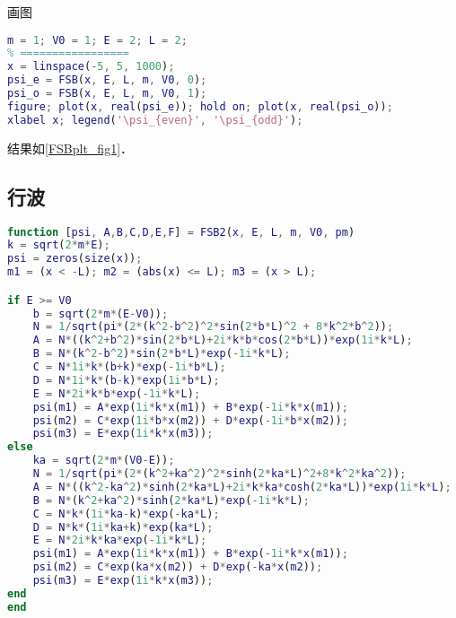 画图
\begin{lstlisting}[language=matlab]
% === 设置参数 =====
m = 1; V0 = 1; E = 2; L = 2;
% =================
x = linspace(-5, 5, 1000);
psi_e = FSB(x, E, L, m, V0, 0);
psi_o = FSB(x, E, L, m, V0, 1);
figure; plot(x, real(psi_e)); hold on; plot(x, real(psi_o));
xlabel x; legend('\psi_{even}', '\psi_{odd}');
\end{lstlisting}
结果如\autoref{FSBplt_fig1}．

\subsection{行波}

\begin{lstlisting}[language=matlab]
% 现在支支持向右的行波 (pm = 1)
function [psi, A,B,C,D,E,F] = FSB2(x, E, L, m, V0, pm)
k = sqrt(2*m*E);
psi = zeros(size(x));
m1 = (x < -L); m2 = (abs(x) <= L); m3 = (x > L);

if E >= V0
    b = sqrt(2*m*(E-V0));
    N = 1/sqrt(pi*(2*(k^2-b^2)^2*sin(2*b*L)^2 + 8*k^2*b^2));
    A = N*((k^2+b^2)*sin(2*b*L)+2i*k*b*cos(2*b*L))*exp(1i*k*L);
    B = N*(k^2-b^2)*sin(2*b*L)*exp(-1i*k*L);
    C = N*1i*k*(b+k)*exp(-1i*b*L);
    D = N*1i*k*(b-k)*exp(1i*b*L);
    E = N*2i*k*b*exp(-1i*k*L);
    psi(m1) = A*exp(1i*k*x(m1)) + B*exp(-1i*k*x(m1));
    psi(m2) = C*exp(1i*b*x(m2)) + D*exp(-1i*b*x(m2));
    psi(m3) = E*exp(1i*k*x(m3));
else
    ka = sqrt(2*m*(V0-E));
    N = 1/sqrt(pi*(2*(k^2+ka^2)^2*sinh(2*ka*L)^2+8*k^2*ka^2));
    A = N*((k^2-ka^2)*sinh(2*ka*L)+2i*k*ka*cosh(2*ka*L))*exp(1i*k*L);
    B = N*(k^2+ka^2)*sinh(2*ka*L)*exp(-1i*k*L);
    C = N*k*(1i*ka-k)*exp(-ka*L);
    D = N*k*(1i*ka+k)*exp(ka*L);
    E = N*2i*k*ka*exp(-1i*k*L);
    psi(m1) = A*exp(1i*k*x(m1)) + B*exp(-1i*k*x(m1));
    psi(m2) = C*exp(ka*x(m2)) + D*exp(-ka*x(m2));
    psi(m3) = E*exp(1i*k*x(m3));
end
end
\end{lstlisting}
